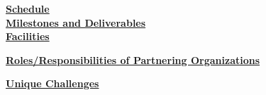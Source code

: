 

\vspace*{.02in}\noindent \underline{\textbf{Schedule}} \\[-2ex]
 

\vspace*{-.05in}\noindent \underline{\textbf{Milestones and Deliverables}} \\[-3ex]
 

\newpage
\vspace*{-.0in}\noindent \underline{\textbf{Facilities}}



\vspace*{-.15in}\noindent \underline{\textbf{Roles/Responsibilities of 
Partnering Organizations}}




\vspace*{-.02in}\noindent \underline{\textbf{Unique Challenges}}


\\[-4ex]
